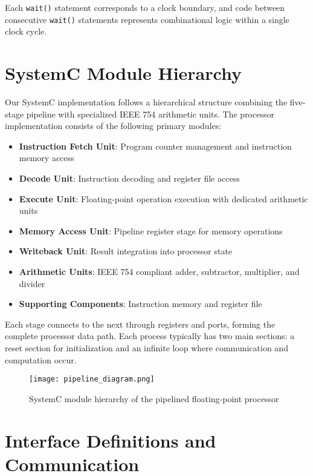 Each \texttt{wait()} statement corresponds to a clock boundary, and code between consecutive \texttt{wait()} statements represents combinational logic within a single clock cycle.

\section{SystemC Module Hierarchy}
\label{sec:module_hierarchy}

Our SystemC implementation follows a hierarchical structure combining the five-stage pipeline with specialized IEEE 754 arithmetic units. The processor implementation consists of the following primary modules:

\begin{itemize}
    \item \textbf{Instruction Fetch Unit}: Program counter management and instruction memory access
    \item \textbf{Decode Unit}: Instruction decoding and register file access
    \item \textbf{Execute Unit}: Floating-point operation execution with dedicated arithmetic units
    \item \textbf{Memory Access Unit}: Pipeline register stage for memory operations
    \item \textbf{Writeback Unit}: Result integration into processor state
    \item \textbf{Arithmetic Units}: IEEE 754 compliant adder, subtractor, multiplier, and divider
    \item \textbf{Supporting Components}: Instruction memory and register file
\end{itemize}

Each stage connects to the next through registers and ports, forming the complete processor data path. Each process typically has two main sections: a reset section for initialization and an infinite loop where communication and computation occur.

\begin{figure}[htbp]
    \centering
    \texttt{[image: pipeline\_diagram.png]}
    \caption{SystemC module hierarchy of the pipelined floating-point processor}
    \label{fig:systemc_hierarchy}
\end{figure}



\section{Interface Definitions and Communication}
\label{sec:interface_definitions}

